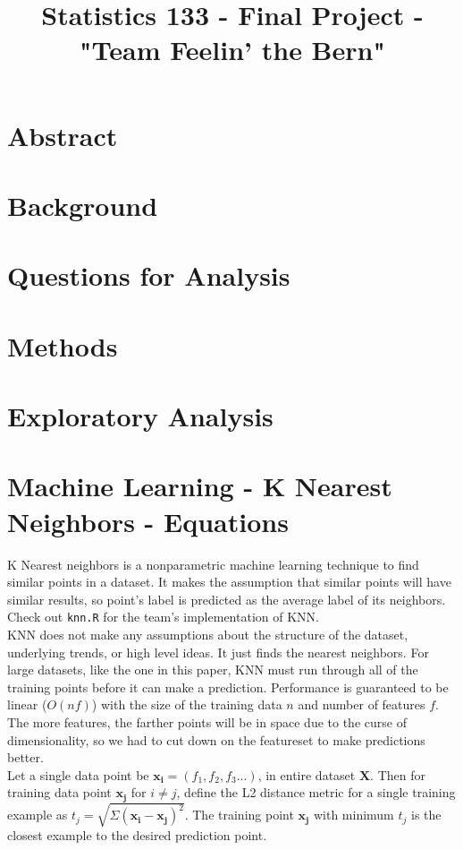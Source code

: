 \documentclass[11pt]{article}
\title{Statistics 133 - Final Project - "Team Feelin' the Bern"}
\author{\Name}
\date{}
\begin{document}
\maketitle

\section*{Abstract}


\section*{Background}

\section*{Questions for Analysis}

\section*{Methods}

\section*{Exploratory Analysis}

\section*{Machine Learning - K Nearest Neighbors - Equations}
K Nearest neighbors is a nonparametric machine learning technique to find similar points in a dataset. It makes the assumption that similar points will have similar results, so point's label is predicted as the average label of its neighbors. Check out \texttt{knn.R} for the team's implementation of KNN. \\ 
KNN does not make any assumptions about the structure of the dataset, underlying trends, or high level ideas. It just finds the nearest neighbors. For large datasets, like the one in this paper, KNN must run through all of the training points before it can make a prediction. Performance is guaranteed to be linear ($O(nf)$) with the size of the training data $n$ and number of features $f$. The more features, the farther points will be in space due to the curse of dimensionality, so we had to cut down on the featureset to make predictions better. \\ 

Let a single data point be $\mathbf{x_i} = (f_1, f_2, f_3...)$, in entire dataset $\mathbf{X}$. Then for training data point $\mathbf{x_j}$ for $i \neq j$, define the L2 distance metric for a single training example as $t_j = \sqrt{\Sigma(\mathbf{x_i} - \mathbf{x_j})^2}$. The training point $\mathbf{x_j}$ with minimum $t_j$ is the closest example to the desired prediction point. 
\end{document}
